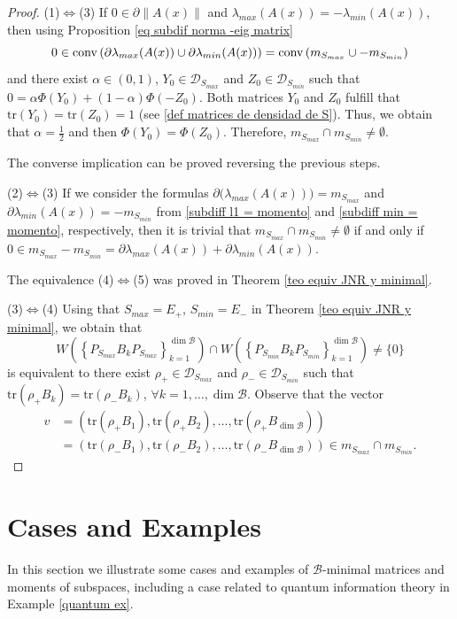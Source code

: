 \documentclass[12pt,a4paper]{article}
\def\calB{\mathcal B}
\def\calD{\mathcal D}
\def\tr{\text{tr}}
\numberwithin{equation}{section}
\begin{document}
\begin{proof}
	(1)$\Leftrightarrow$(3) If $0\in \partial \|A(x)\|$ and $\lambda_{max}(A(x))=-\lambda_{min}(A(x))$, then using Proposition \ref{eq subdif norma -eig matrix}
	$$0\in {\rm conv}\left(\partial \lambda_{max}(A(x))\cup\partial \lambda_{min}(A(x)) \right)={\rm conv}\left(m_{S_{max}}\cup -m_{S_{min}} \right)
	$$ 
	and there exist $\alpha\in (0,1)$, $Y_0\in \mathcal{D}_{S_{max}}$ and $Z_0\in \mathcal{D}_{S_{min}}$ such that $0=\alpha \Phi(Y_0)+(1-\alpha)\Phi(-Z_0)$. Both matrices $Y_0$ and $Z_0$ fulfill that $\tr(Y_0)=\tr(Z_0)=1$ (see \eqref{def matrices de densidad de S}). Thus, we obtain that $\alpha=\frac 12$ and then $\Phi(Y_0)=\Phi(Z_0)$. Therefore, $m_{S_{max}}\cap m_{S_{min}}\neq \emptyset$. 
	
	
	The converse implication can be proved reversing the previous steps.
	
	
	(2)$\Leftrightarrow$(3) If we consider
	the formulas $\partial\big(\lambda_{max}(A(x))\big)= m_{S_{max}}$
	and $\partial \lambda_{min}(A(x))=-m_{S_{min}}$ from  \eqref{subdiff l1 = momento} and  \eqref{subdiff min = momento}, respectively, then it is trivial that   $m_{S_{max}}\cap m_{S_{min}}\neq \emptyset$ if and only if $0\in m_{S_{max}}-m_{S_{min}}=\partial \lambda_{max}(A(x))+\partial \lambda_{min}(A(x))$.
	
	The equivalence (4)$\Leftrightarrow$(5) was proved in Theorem \ref{teo equiv JNR y minimal}.
	
	(3)$\Leftrightarrow$(4) Using that $S_{max}=E_+$, $S_{min}=E_-$ in Theorem \ref{teo equiv JNR y minimal}, we obtain that 
	\[W\left( \left\lbrace P_{S_{max}}B_kP_{S_{max}}\right\rbrace_{k=1}^{\dim{\calB}} \right)\cap W\left( \left\lbrace P_{S_{min}}B_kP_{S_{min}}\right\rbrace_{k=1}^{\dim{\calB}} \right)\neq \{0\} \]
	is equivalent to there exist $\rho_+\in \calD_{S_{max}}$ and $\rho_-\in \calD_{S_{min}}$ such that $\tr(\rho_+B_k )=\tr(\rho_-B_k )$, $\forall k=1,\dots,\dim\calB$. Observe that the vector 
	\begin{equation*}
		\begin{split}
			v&=\left(\tr(\rho_+B_1), \tr(\rho_+B_2),...,\tr(\rho_+B_{\dim\calB}) \right) \\ &=\left(\tr(\rho_-B_1), \tr(\rho_-B_2),...,\tr(\rho_-B_{\dim\calB})\right) \in m_{S_{max}}\cap m_{S_{min}}.		
		\end{split}
	\end{equation*}
\end{proof}


\section{Cases and Examples}\label{sec examples}
In this section we illustrate some cases and examples of $\calB$-minimal matrices and moments of subspaces, including a case related to quantum information theory in Example \ref{quantum ex}.
\end{document}
